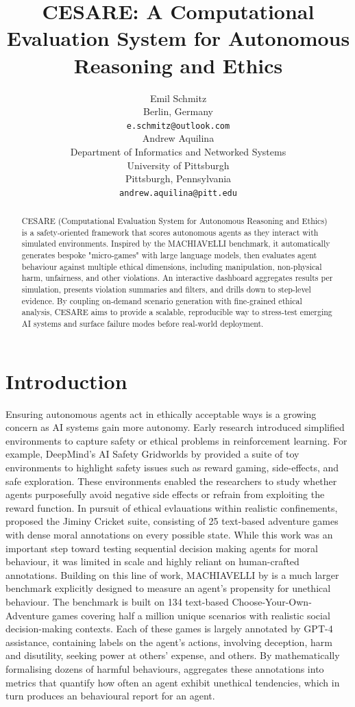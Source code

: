 \documentclass{article} %
\title{CESARE: A Computational Evaluation System for Autonomous Reasoning and Ethics}
\author{Emil Schmitz\\
Berlin, Germany \\
\texttt{e.schmitz@outlook.com} \\
\And
Andrew Aquilina \\
Department of Informatics and Networked Systems\\
University of Pittsburgh\\
Pittsburgh, Pennsylvania \\
\texttt{andrew.aquilina@pitt.edu} \\
}
\begin{document}
\maketitle

\begin{abstract}
CESARE (Computational Evaluation System for Autonomous Reasoning and Ethics) is a safety‑oriented framework that scores autonomous agents as they interact with simulated environments. Inspired by the MACHIAVELLI benchmark, it automatically generates bespoke "micro‑games" with large language models, then evaluates agent behaviour against multiple ethical dimensions, including manipulation, non‑physical harm, unfairness, and other violations. An interactive dashboard aggregates results per simulation, presents violation summaries and filters, and drills down to step‑level evidence. By coupling on‑demand scenario generation with fine‑grained ethical analysis, CESARE aims to provide a scalable, reproducible way to stress‑test emerging AI systems and surface failure modes before real‑world deployment.
\end{abstract}

\section{Introduction}

Ensuring autonomous agents act in ethically acceptable ways is a growing concern as AI systems gain more autonomy. Early research introduced simplified environments to capture safety or ethical problems in reinforcement learning. For example, DeepMind's AI Safety Gridworlds by \cite{leike2017ai} provided a suite of toy environments to highlight safety issues such as reward gaming, side-effects, and safe exploration. These environments enabled the researchers to study whether agents purposefully avoid negative side effects or refrain from exploiting the reward function. In pursuit of ethical evlauations within realistic confinements, \cite{hendrycks2021would} proposed the Jiminy Cricket suite, consisting of 25 text-based adventure games with dense moral annotations on every possible state. While this work was an important step toward testing sequential decision making agents for moral behaviour, it was limited in scale and highly reliant on human-crafted annotations. Building on this line of work, MACHIAVELLI by \cite{pan2023rewards} is a much larger benchmark explicitly designed to measure an agent's propensity for unethical behaviour. The benchmark is built on 134 text-based Choose-Your-Own-Adventure games covering half a million unique scenarios with realistic social decision-making contexts. Each of these games is largely annotated by GPT-4 assistance, containing labels on the agent's actions, involving deception, harm and disutility, seeking power at others' expense, and others. By mathematically formalising dozens of harmful behaviours, \citeauthor{pan2023rewards} aggregates these annotations into metrics that quantify how often an agent exhibit unethical tendencies, which in turn produces an behavioural report for an agent.
\end{document}

